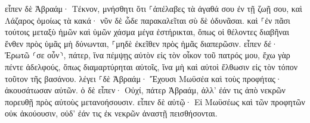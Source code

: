 \documentclass{openreader}
\begin{document}
εἶπεν δὲ Ἀβραάμ· Τέκνον, μνήσθητι ὅτι ⸀ἀπέλαβες τὰ ἀγαθά σου ἐν τῇ ζωῇ σου, καὶ Λάζαρος ὁμοίως τὰ κακά· νῦν δὲ ὧδε παρακαλεῖται σὺ δὲ ὀδυνᾶσαι. 
καὶ ⸀ἐν πᾶσι τούτοις μεταξὺ ἡμῶν καὶ ὑμῶν χάσμα μέγα ἐστήρικται, ὅπως οἱ θέλοντες διαβῆναι ἔνθεν πρὸς ὑμᾶς μὴ δύνωνται, ⸀μηδὲ ἐκεῖθεν πρὸς ἡμᾶς διαπερῶσιν. 
εἶπεν δέ· Ἐρωτῶ ⸂σε οὖν⸃, πάτερ, ἵνα πέμψῃς αὐτὸν εἰς τὸν οἶκον τοῦ πατρός μου, 
ἔχω γὰρ πέντε ἀδελφούς, ὅπως διαμαρτύρηται αὐτοῖς, ἵνα μὴ καὶ αὐτοὶ ἔλθωσιν εἰς τὸν τόπον τοῦτον τῆς βασάνου. 
λέγει ⸀δὲ Ἀβραάμ· Ἔχουσι Μωϋσέα καὶ τοὺς προφήτας· ἀκουσάτωσαν αὐτῶν. 
ὁ δὲ εἶπεν· Οὐχί, πάτερ Ἀβραάμ, ἀλλ’ ἐάν τις ἀπὸ νεκρῶν πορευθῇ πρὸς αὐτοὺς μετανοήσουσιν. 
εἶπεν δὲ αὐτῷ· Εἰ Μωϋσέως καὶ τῶν προφητῶν οὐκ ἀκούουσιν, οὐδ’ ἐάν τις ἐκ νεκρῶν ἀναστῇ πεισθήσονται. 
\end{document}
